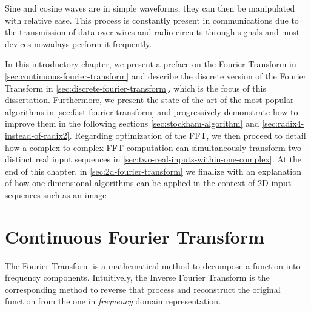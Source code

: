 \documentclass[
  oneside,
  11pt, a4paper,
  footinclude=true,
  headinclude=true,
  cleardoublepage=empty
]{scrbook}
\begin{document}
Sine and cosine waves are in simple waveforms, they can then be manipulated with relative ease. This process is constantly present in communications due to the transmission of data over wires and radio circuits through signals and most devices nowadays perform it frequently.
\newline

In this introductory chapter, we present a preface on the Fourier Transform in \autoref{sec:continuous-fourier-transform} and describe the discrete version of the Fourier Transform in \autoref{sec:discrete-fourier-transform}, which is the focus of this dissertation. Furthermore, we present the state of the art of the most popular algorithms in \autoref{sec:fast-fourier-transform} and progressively demonstrate how to improve them in the following sections \autoref{sec:stockham-algorithm} and \autoref{sec:radix4-instead-of-radix2}. 
Regarding optimization of the FFT, we then proceed to detail how a complex-to-complex FFT computation can simultaneously transform two distinct real input sequences in \autoref{sec:two-real-inputs-within-one-complex}. At the end of this chapter, in \autoref{sec:2d-fourier-transform} we finalize with an explanation of how one-dimensional algorithms can be applied in the context of 2D input sequences such as an image


\section{Continuous Fourier Transform} \label{sec:continuous-fourier-transform}

The Fourier Transform is a mathematical method to decompose a function into frequency components. Intuitively, the Inverse Fourier Transform is the corresponding method to reverse that process and reconstruct the original function from the one in \textit{frequency} domain representation.
\end{document}
